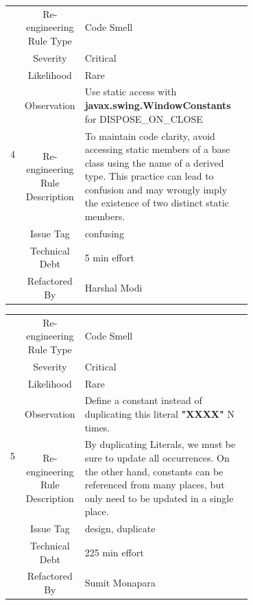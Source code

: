 \documentclass[12pt,letterpaper]{report}
\begin{document}
{\begin{table}
    \begin{tabular}{|c|c|p{0.7\linewidth}|}
    \hline   
    \multirow{8}{*}{4}
        & Re-engineering Rule Type & Code Smell \\
    \cline{2-3}
       & Severity &  Critical \\
    \cline{2-3}
       & Likelihood &  Rare \\
    \cline{2-3}
       & Observation & Use static access with \textbf{javax.swing.WindowConstants} for DISPOSE\_ON\_CLOSE \\
    \cline{2-3}
       & Re-engineering Rule Description & To maintain code clarity, avoid accessing static members of a base class using the name of a derived type. This practice can lead to confusion and may wrongly imply the existence of two distinct static members.  \\
    \cline{2-3}
       & Issue Tag & confusing \\
    \cline{2-3}
       & Technical Debt & 5 min effort  \\
    \cline{2-3}
       & Refactored By & Harshal Modi \\
    \hline
    \end{tabular}
\end{table}

\begin{table}
    \begin{tabular}{|c|c|p{0.7\linewidth}|}
    \hline   
    \multirow{8}{*}{5}
        & Re-engineering Rule Type & Code Smell \\
    \cline{2-3}
       & Severity &  Critical \\
    \cline{2-3}
       & Likelihood &  Rare \\
    \cline{2-3}
       & Observation & Define a constant instead of duplicating this literal \textbf{"XXXX"} N times. \\
    \cline{2-3}
       & Re-engineering Rule Description & By duplicating Literals, we must be sure to update all occurrences. On the other hand, constants can be referenced from many places, but only need to be updated in a single place.  \\
    \cline{2-3}
       & Issue Tag & design, duplicate \\
    \cline{2-3}
       & Technical Debt & 225 min effort  \\
    \cline{2-3}
       & Refactored By & Sumit Monapara \\
    \hline
    \end{tabular}
\end{table}

}
\end{document}
